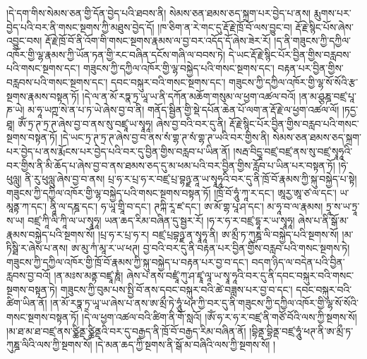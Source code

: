 །དེ་དག་གིས་སེམས་ཅན་གྱི་དོན་བྱེད་པའི་ཐབས་ནི། སེམས་ཅན་ཐམས་ཅད་སྐྲག་པར་བྱེད་པ་ནས། རྨུགས་པར་བྱེད་པའི་བར་ནི་གསང་སྔགས་ཀྱི་མཐུས་བྱེད་དོ། །ཁ་ཅིག་ན་རེ་གང་དུ་རྡོ་རྗེ་ཁྲོ་བོ་ལས་བྱུང་བ། རྡོ་རྗེ་སྙིང་པོས་ཞེས་འབྱུང་བས། རྡོ་རྗེ་ཁྲོ་བོ་ནི་འོག་གི་གསང་སྔགས་རྣམས་ལ་བྱ་བར་འདོད་དོ་ཞེས་ཟེར་རོ། །ད་ནི་གཟུངས་ཀྱི་དཀྱིལ་འཁོར་གྱི་ལྷ་རྣམས་ཀྱི་ཡོན་ཏན་གྱི་རང་བཞིན་དངོས་གཞི་ལ་བབས་ཏེ། དེ་ཡང་རྡོ་རྗེ་སྙིང་པོར་བྱིན་གྱིས་བརླབས་པའི་གསང་སྔགས་དང་། གཟུངས་ཀྱི་དཀྱིལ་འཁོར་གྱི་ལྷ་བསྐྱེད་པའི་གསང་སྔགས་དང་། བརྟན་པར་བྱིན་གྱིས་བརླབས་པའི་གསང་སྔགས་དང་། དབང་བསྐུར་བའི་གསང་སྔགས་དང་། གཟུངས་ཀྱི་དཀྱིལ་འཁོར་གྱི་ལྷ་སོ་སོའི་རྩ་སྔགས་རྣམས་བསྟན་ཏོ། །དེ་ལ་ན་མོ་རཏྣ་ཏྲ་ཡཱ་ཡ་ནི་དཀོན་མཆོག་གསུམ་ལ་ཕྱག་འཚལ་བའོ། །ན་མ་ཤྩཎྜ་བཛྲ་པཱ་ཎ་ཡེ། མ་ཧཱ་ཡཀྵ་སེ་ན་པ་ཏ་ཡེ་ཞེས་བྱ་བ་ནི། གནོད་སྦྱིན་གྱི་སྡེ་དཔོན་ཆེན་པོ་ལག་ན་རྡོ་རྗེ་ལ་ཕྱག་འཚལ་ལོ། །ཏདྱ་ཐཱ། ཨོཾ་ཏྲ་ཊ་ཏྲ་ཊ་ཞེས་བྱ་བ་ནས་སུ་བཛྲཱ་ཡ་སྭཱཧཱ། ཞེས་བྱ་བའི་བར་དུ་ནི། རྡོ་རྗེ་སྙིང་པོར་བྱིན་གྱིས་བརླབ་པའི་གསང་སྔགས་བསྟན་ཏོ། །དེ་ཡང་ཏྲ་ཊ་ཏྲ་ཊ་ཞེས་བྱ་བ་ནས་སཾ་གྷ་ཊ་སཾ་གྷ་ཊ་ཡའི་བར་གྱིས་ནི། སེམས་ཅན་ཐམས་ཅད་སྐྲག་པར་བྱེད་པ་ནས་རྨོངས་པར་བྱེད་པའི་བར་དུ་བྱིན་གྱིས་བརླབ་པ་ཡིན་ནོ། །སརྦ་བིདྱཱ་བཛྲ་བཛྲ་ནས་སུ་བཛྲ་སྭཱཧཱའི་བར་གྱིས་ནི་མི་ཆོད་པ་ཞེས་བྱ་བ་ནས་ཐམས་ཅད་དུ་མ་ཕམ་པའི་བར་བྱིན་གྱིས་རློབ་པ་ཡིན་པར་བསྟན་ཏོ། །ཧེ་ཕུལླུ། ནི་རུ་ཕུལླུ་ཞེས་བྱ་བ་ནས། པྲ་ཧ་ར་པྲ་ཧ་ར་བཛྲ་པྲ་བྷཉྫ་ནཱ་ཡ་སྭཱཧཱའི་བར་དུ་ནི་ཁྲོ་བོ་རྣམས་ཀྱི་སྐུ་བསྐྱེད་པ་སྟེ། གཟུངས་ཀྱི་དཀྱིལ་འཁོར་གྱི་ལྷ་བསྐྱེད་པའི་གསང་སྔགས་བསྟན་ཏོ། །ཁྲོ་བོ་ཧཱུཾ་ཀཱ་ར་དང་། ཨཱརྱ་ཨཱ་ཙ་ལ་དང་། ཡ་མཱནྟ་ཀ་དང་། ནཱི་ལ་དཎྜ་དང་། ཧ་ཡཱ་གྲཱི་བ་དང་། ཊཀྐི་རཱ་ཛ་དང་། ཨ་མོ་གྷ་པཱ་ཤ་དང་། མ་ཧཱ་བ་ལ་རྣམས། ཏྲཱ་ས་ཡ་ཏྲཱ་ས་ཡ། བཛྲ་ཀཱི་ལི་ཀཱི་ལ་ཡ་སྭཱཧཱ། ཡན་ཆད་རིམ་བཞིན་དུ་སྦྱར་རོ། །ཧ་ར་ཧ་ར་བཛྲ་དྷཱ་ར་ཡ་སྭཱཧཱ། ཞེས་པ་ནི་སྒོ་མ་རྣམས་བསྐྱེད་པའི་སྔགས་སོ། །པྲ་ཧ་ར་པྲ་ཧ་ར། བཛྲ་པྲབྷཉྫ་ན་སྭཱཧཱ་ནི། ཨ་མྲྀ་ཏ་ཀུཎྜ་ལི་བསྐྱེད་པའི་སྔགས་སོ། །མ་ཏིསྠི་ར་ཞེས་པ་ནས། ཨ་མུ་ཀཾ་མཱ་ར་ཡ་ཕཊ། བྱ་བའི་བར་དུ་ནི་བརྟན་པར་བྱིན་གྱིས་བརླབ་པའི་གསང་སྔགས་ཏེ། གཟུངས་ཀྱི་དཀྱིལ་འཁོར་གྱི་ཁྲོ་བོ་རྣམས་ཀྱི་སྐུ་བསྐྱེད་པ་བརྟན་པར་བྱ་བ་དང་། བདག་ཉིད་ལ་བདེན་པའི་བྱིན་རླབས་བྱ་བའོ། །ན་མཿས་མནྟ་བཛྲཱ་ཎཱཾ། ཞེས་པ་ནས་བཛྲཱཾ་ཀུ་ཤ་ཛྭཱ་ལཱ་ཡ་སྭཱ་ཧཱའི་བར་དུ་ནི་དབང་བསྐུར་བའི་གསང་སྔགས་བསྟན་ཏེ། གཟུངས་ཀྱི་བུམ་པས་སྤྱི་བོ་ནས་དབང་བསྐུར་བའི་ཚེ་བཟླས་པར་བྱ་བ་དང་། དབང་བསྐུར་བའི་ཚིག་ཡིན་ནོ། །ན་མོ་རཏྣ་ཏྲ་ཡཱ་ཡ་ཞེས་པ་ནས་ཨ་མྲྀ་ཏེ་ཧཱུཾ་ཕཊ་ཀྱི་བར་དུ་ནི་གཟུངས་ཀྱི་དཀྱིལ་འཁོར་གྱི་ལྷ་སོ་སོའི་གསང་སྔགས་བསྟན་ཏོ། །དེ་ལ་ཕྱག་འཚལ་བའི་ཚིག་ནི་གོ་སླའོ། །ཨོཾ་ཧ་ར་ཧ་ར་བཛྲ་ནི་གཙོ་བོའི་ལས་ཀྱི་སྔགས་སོ། །མ་ཐ་མ་ཐ་བཛྲ་ནས་ཙྪིནྡ་ཙྪིནྡའི་བར་དུ་བརྒྱད་ནི་ཁྲོ་བོ་བརྒྱད་རིམ་བཞིན་ནོ། །བྷིནྡ་བྷིནྡ་བཛྲ་ཧཱུཾ་ཕཊ་ནི་ཨ་མྲྀ་ཏ་ཀུཎྜ་ལིའི་ལས་ཀྱི་སྔགས་སོ། །དེ་མན་ཆད་ཀྱི་སྔགས་ནི་སྒོ་མ་བཞིའི་ལས་ཀྱི་སྔགས་སོ། །
